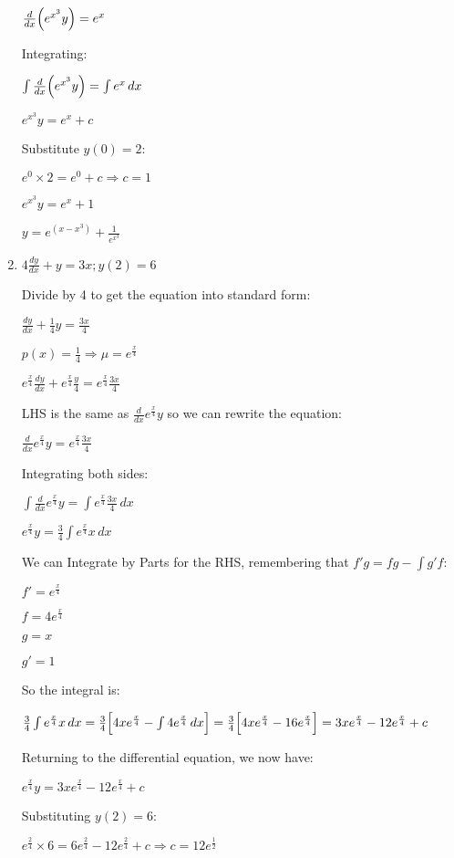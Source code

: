 \documentclass[../main.tex]{subfiles}
\begin{document}
\begin{enumerate}[itemsep=0.7cm]
    $\frac{d}{dx}\Bigl(e^{x^3}y\Bigr)=e^x$

    Integrating:

    $\int \frac{d}{dx}\Bigl(e^{x^3}y\Bigr)=\int e^x\,dx$

    $e^{x^3}y=e^x +c$

    Substitute $y(0)=2$:

    $e^0\times 2=e^0+c \Rightarrow c=1$

    $e^{x^3}y=e^x +1$

    $y=e^{(x-x^3)}+\frac{1}{e^{x^3}}$

    \item 
    $4\frac{dy}{dx}+y=3x; y(2)=6$

    Divide by 4 to get the equation into standard form:

    $\frac{dy}{dx}+\frac{1}{4}y=\frac{3x}{4}$

    $p(x)=\frac{1}{4} \Rightarrow \mu=e^{\frac{x}{4}}$

    $e^{\frac{x}{4}}\frac{dy}{dx}+e^{\frac{x}{4}}\frac{y}{4}=e^{\frac{x}{4}}\frac{3x}{4}$

    LHS is the same as $\frac{d}{dx}e^{\frac{x}{4}}y$ so we can rewrite the equation:

    $\frac{d}{dx}e^{\frac{x}{4}}y=e^{\frac{x}{4}}\frac{3x}{4}$

    Integrating both sides:

    $\int \frac{d}{dx}e^{\frac{x}{4}}y=\int e^{\frac{x}{4}}\frac{3x}{4}\,dx$

    $e^{\frac{x}{4}}y=\frac{3}{4}\int e^{\frac{x}{4}}x\,dx$

    We can Integrate by Parts for the RHS, remembering that $f'g=fg-\int g'f$:

    $f'=e^{\frac{x}{4}}$

    $f=4e^{\frac{x}{4}}$

    $g=x$

    $g'=1$

    So the integral is:
    
    $\frac{3}{4}\int e^{\frac{x}{4}}x\,dx=\frac{3}{4}\Bigl[4xe^{\frac{x}{4}}-\int 4e^{\frac{x}{4}}\,dx\Bigr]=\frac{3}{4}\Bigl[4xe^{\frac{x}{4}}-16e^{\frac{x}{4}}\Bigr]=3xe^{\frac{x}{4}}-12e^{\frac{x}{4}}+c$

    Returning to the differential equation, we now have:

    $e^{\frac{x}{4}}y=3xe^{\frac{x}{4}}-12e^{\frac{x}{4}}+c$

    Substituting $y(2)=6$:

    $e^{\frac{2}{4}}\times 6=6e^{\frac{2}{4}}-12e^{\frac{2}{4}}+c \Rightarrow c=12e^{\frac{1}{2}}$


\end{enumerate}
\end{document}
